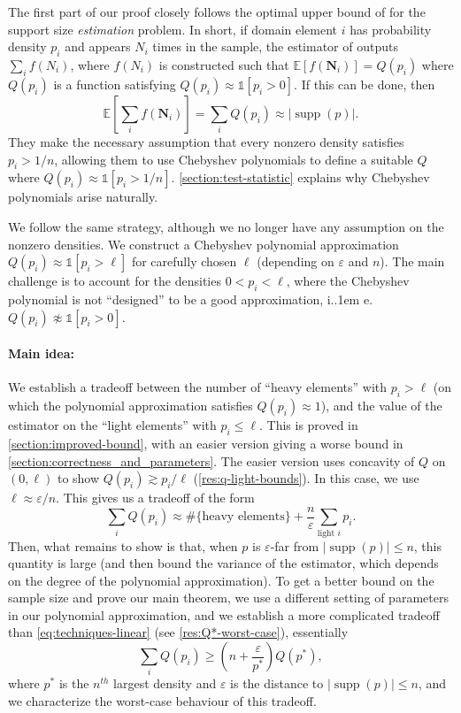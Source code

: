 \documentclass[10pt,a4paper]{article}
\newcommand*\ie{i.\kern.1em e.\ }
\DeclareMathOperator{\supp}{supp}   %
\newcommand{\Ex}[1]{\bE \left[ #1 \right]}
\newcommand{\ind}[1]{\mathds{1} \left[ #1 \right] }
\newcommand{\bE}{\ensuremath{\mathbb{E}}}
\renewcommand{\epsilon}{\varepsilon}
\begin{document}
The first part of our proof closely follows the optimal upper bound of \cite{WY19} for the support
size \emph{estimation} problem. In short, if domain element $i$ has probability density $p_i$ and
appears $N_i$ times in the sample, the estimator of \cite{WY19} outputs $\sum_i f(N_i)$, where
$f(N_i)$ is constructed such that $\Ex{f(\bm N_i)} = Q(p_i)$ where $Q(p_i)$ is a function satisfying
$Q(p_i) \approx \ind{p_i > 0}$. If this can be done, then
\[
    \Ex{ \sum_i f(\bm N_i) } = \sum_i Q(p_i) \approx |\supp(p)| .
\]
They make the necessary assumption that every nonzero density satisfies $p_i > 1/n$, allowing them
to use Chebyshev polynomials to define a suitable $Q$ where $Q(p_i) \approx \ind{p_i > 1/n}$. 
\cref{section:test-statistic} explains why Chebyshev polynomials arise naturally.

We follow the same strategy, although we no longer have any assumption on the nonzero densities.  We
construct a Chebyshev polynomial approximation $Q(p_i) \approx \ind{p_i > \ell}$ for carefully
chosen $\ell$ (depending on $\epsilon$ and $n$). The main challenge is to account for the densities
$0 < p_i < \ell$, where the Chebyshev polynomial is not ``designed'' to be a good approximation, \ie
$Q(p_i) \not\approx \ind{p_i > 0}$.

\paragraph*{Main idea:} We establish a tradeoff between the number of ``heavy elements'' with $p_i >
\ell$ (on which the polynomial approximation satisfies $Q(p_i) \approx 1$), and the value of the
estimator on the ``light elements'' with $p_i \leq \ell$. This is proved in
\cref{section:improved-bound}, with an easier version giving a worse bound in
\cref{section:correctness_and_parameters}. The easier version uses concavity of $Q$ on $(0, \ell)$
to show $Q(p_i) \gtrsim p_i/\ell$ (\cref{res:q-light-bounds}).  In this case, we use $\ell \approx
\epsilon/n$.  This gives us a tradeoff of the form
\begin{equation}
\label{eq:techniques-linear}
    \sum_i Q(p_i) \approx  \#\{\text{heavy elements}\} + \frac{n}{\epsilon} \sum_{\text{light }
i} p_i .
\end{equation}
Then, what remains to show is that, when $p$ is $\epsilon$-far from $|\supp(p)| \leq n$, this
quantity is large (and then bound the variance of the estimator, which depends on the degree of the
polynomial approximation). To get a better bound on the sample size and prove our main theorem, we
use a different setting of parameters in our polynomial approximation, and we establish a more
complicated tradeoff than \cref{eq:techniques-linear} (see \cref{res:Q*-worst-case}), essentially
\begin{equation}
    \sum_i Q(p_i) \geq \left(n + \frac{\epsilon}{p^*}\right) Q(p^*),
\end{equation}
where $p^*$ is the $n^{th}$ largest density and $\epsilon$ is the distance to $|\supp(p)|\leq n$,
and we characterize the worst-case behaviour of this tradeoff. 
\end{document}

